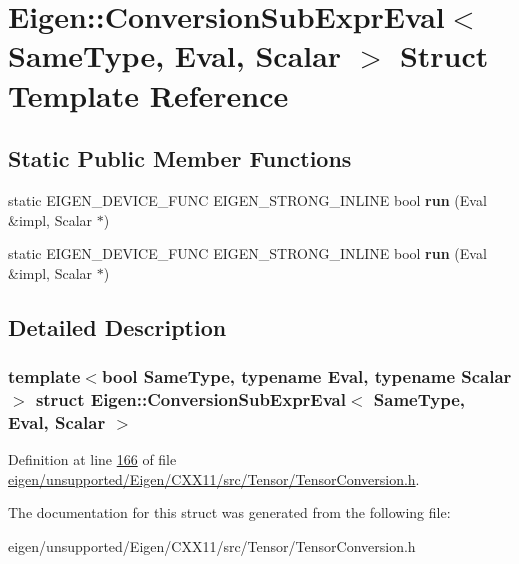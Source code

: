 \hypertarget{struct_eigen_1_1_conversion_sub_expr_eval}{}\section{Eigen\+:\+:Conversion\+Sub\+Expr\+Eval$<$ Same\+Type, Eval, Scalar $>$ Struct Template Reference}
\label{struct_eigen_1_1_conversion_sub_expr_eval}
\subsection*{Static Public Member Functions}
\begin{DoxyCompactItemize}
\item 
\mbox{\label{struct_eigen_1_1_conversion_sub_expr_eval_afa75be2ded04268ae7993e44e125680d}} 
static E\+I\+G\+E\+N\+\_\+\+D\+E\+V\+I\+C\+E\+\_\+\+F\+U\+NC E\+I\+G\+E\+N\+\_\+\+S\+T\+R\+O\+N\+G\+\_\+\+I\+N\+L\+I\+NE bool {\bfseries run} (Eval \&impl, Scalar $\ast$)
\item 
\mbox{\label{struct_eigen_1_1_conversion_sub_expr_eval_afa75be2ded04268ae7993e44e125680d}} 
static E\+I\+G\+E\+N\+\_\+\+D\+E\+V\+I\+C\+E\+\_\+\+F\+U\+NC E\+I\+G\+E\+N\+\_\+\+S\+T\+R\+O\+N\+G\+\_\+\+I\+N\+L\+I\+NE bool {\bfseries run} (Eval \&impl, Scalar $\ast$)
\end{DoxyCompactItemize}


\subsection{Detailed Description}
\subsubsection*{template$<$bool Same\+Type, typename Eval, typename Scalar$>$\newline
struct Eigen\+::\+Conversion\+Sub\+Expr\+Eval$<$ Same\+Type, Eval, Scalar $>$}



Definition at line \hyperlink{eigen_2unsupported_2_eigen_2_c_x_x11_2src_2_tensor_2_tensor_conversion_8h_source_l00166}{166} of file \hyperlink{eigen_2unsupported_2_eigen_2_c_x_x11_2src_2_tensor_2_tensor_conversion_8h_source}{eigen/unsupported/\+Eigen/\+C\+X\+X11/src/\+Tensor/\+Tensor\+Conversion.\+h}.



The documentation for this struct was generated from the following file\+:\begin{DoxyCompactItemize}
\item 
eigen/unsupported/\+Eigen/\+C\+X\+X11/src/\+Tensor/\+Tensor\+Conversion.\+h\end{DoxyCompactItemize}
